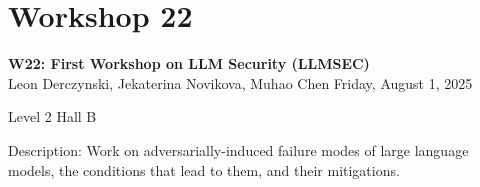 \clearpage


\section[W22: First Workshop on LLM Security (LLMSEC)]{Workshop 22}
\label{workshop_22}

\begin{center}
    {\Large \textbf{W22: First Workshop on LLM Security (LLMSEC)}}\\
    

Leon Derczynski, Jekaterina Novikova, Muhao Chen
    Friday, August 1, 2025

   Level 2 Hall B
    
\end{center}

Description: Work on adversarially-induced failure modes of large language models, the conditions that lead to them, and their mitigations.

